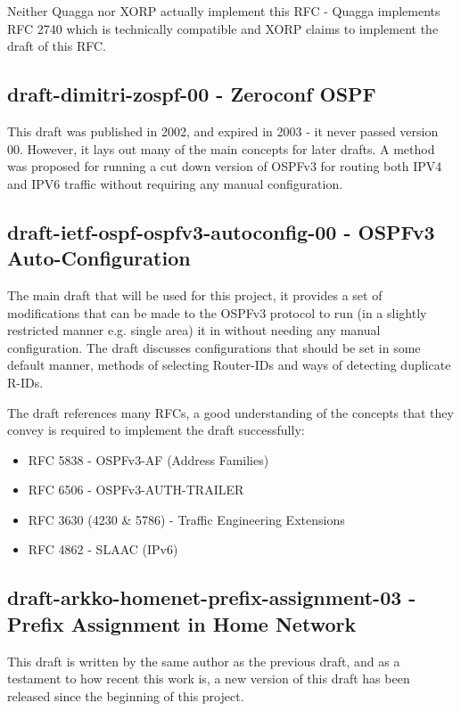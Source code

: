 \documentclass[12pt]{report}
\begin{document}
	Neither Quagga nor XORP actually implement this RFC - Quagga implements
	RFC 2740 which is technically compatible and XORP claims to implement
	the draft of this RFC. 

	\subsection{draft-dimitri-zospf-00 - Zeroconf OSPF}
	This draft was published in 2002, and expired in 2003 - it never passed
	version 00.  However, it lays out many of the main concepts for later
	drafts.  A method was proposed for running a cut down version of OSPFv3
	for routing both IPV4 and IPV6 traffic without requiring any manual
		configuration. 

	\subsection{draft-ietf-ospf-ospfv3-autoconfig-00 - OSPFv3 Auto-Configuration} 
	The main draft that will be used for this project, it provides a set of
	modifications that can be made to the OSPFv3 protocol to run (in a
	slightly restricted manner e.g.  single area) it in without needing any
	manual configuration.  The draft discusses configurations that should be
	set in some default manner, methods of selecting Router-IDs and ways of
	detecting duplicate R-IDs. 

	The draft references many RFCs, a good understanding of the concepts 
	that they convey is required to implement the draft successfully:

	\begin{itemize}
			\item RFC 5838 - OSPFv3-AF (Address Families)
			\item RFC 6506 - OSPFv3-AUTH-TRAILER
			\item RFC 3630 (4230 \& 5786) - 
			Traffic Engineering Extensions 
			\item RFC 4862 - SLAAC (IPv6) 
			\end{itemize}
	

	\subsection{draft-arkko-homenet-prefix-assignment-03 -
	Prefix Assignment in Home Network}
 		
	This draft is written by the same author as the previous draft, and as a
	testament to how recent this work is, a new version of this draft has
	been released since the beginning of this project. 
	
\end{document}
